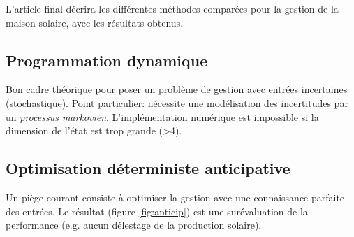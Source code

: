\documentclass[a4paper,10pt,twocolumn]{article}
\begin{document}
L'article final décrira les différentes méthodes comparées pour la gestion de la maison solaire,
avec les résultats obtenus.

\subsection{Programmation dynamique}
Bon cadre théorique pour poser un problème de gestion avec entrées incertaines (stochastique).
Point particulier: nécessite une modélisation des incertitudes par un \emph{processus markovien}\cite{Haessig:2013:ESPy}.
L'implémentation numérique est impossible si la dimension de l'état est trop grande (>4).


\subsection{Optimisation déterministe anticipative}

Un piège courant consiste à optimiser la gestion avec une connaissance parfaite des entrées.
Le résultat (figure \ref{fig:anticip}) est une surévaluation de la performance (e.g. aucun délestage de la production solaire).

\end{document}
